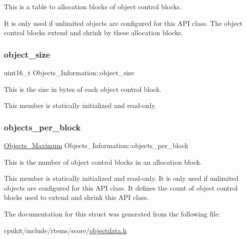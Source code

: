 This is a table to allocation blocks of object control blocks. 

It is only used if unlimited objects are configured for this A\+PI class. The object control blocks extend and shrink by these allocation blocks. \mbox{\label{structObjects__Information_a0dd4f0af287535a342ebec694d704292}} 
\subsubsection{\texorpdfstring{object\_size}{object\_size}}
{\footnotesize\ttfamily uint16\+\_\+t Objects\+\_\+\+Information\+::object\+\_\+size}



This is the size in bytes of each object control block. 

This member is statically initialized and read-\/only. \mbox{\label{structObjects__Information_acd5a58dad9203b694688f47b7948418a}} 
\subsubsection{\texorpdfstring{objects\_per\_block}{objects\_per\_block}}
{\footnotesize\ttfamily \mbox{\hyperlink{group__RTEMSScoreObject_gaa2735357885ec7d7157c32f3f835f9ae}{Objects\+\_\+\+Maximum}} Objects\+\_\+\+Information\+::objects\+\_\+per\+\_\+block}



This is the number of object control blocks in an allocation block. 

This member is statically initialized and read-\/only. It is only used if unlimited objects are configured for this A\+PI class. It defines the count of object control blocks used to extend and shrink this A\+PI class. 

The documentation for this struct was generated from the following file\+:\begin{DoxyCompactItemize}
\item 
cpukit/include/rtems/score/\mbox{\hyperlink{objectdata_8h}{objectdata.\+h}}\end{DoxyCompactItemize}

